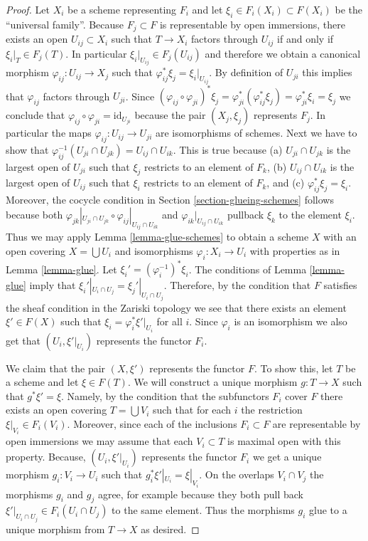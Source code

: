 \begin{proof}
Let $X_i$ be a scheme representing $F_i$ and let
$\xi_i \in F_i(X_i) \subset F(X_i)$ be the ``universal family''.
Because $F_j \subset F$ is representable by open immersions,
there exists an open $U_{ij} \subset X_i$ such that
$T \to X_i$ factors through $U_{ij}$ if and only if
$\xi_i|_T \in F_j(T)$. In particular
$\xi_i|_{U_{ij}} \in F_j(U_{ij})$ and therefore we obtain a
canonical morphism $\varphi_{ij} : U_{ij} \to X_j$ such that
$\varphi_{ij}^*\xi_j = \xi_i|_{U_{ij}}$. By definition of $U_{ji}$
this implies that $\varphi_{ij}$ factors through $U_{ji}$.
Since $(\varphi_{ij} \circ \varphi_{ji})^*\xi_j
=\varphi_{ji}^*(\varphi_{ij}^*\xi_j) =
\varphi_{ji}^*\xi_i = \xi_j$ we conclude that
$\varphi_{ij} \circ \varphi_{ji} = \text{id}_{U_{ji}}$
because the pair $(X_j, \xi_j)$ represents $F_j$.
In particular the maps $\varphi_{ij} : U_{ij} \to U_{ji}$
are isomorphisms of schemes.
Next we have to show that
$\varphi_{ij}^{-1}(U_{ji} \cap U_{jk}) = U_{ij} \cap U_{ik}$.
This is true because (a) $U_{ji} \cap U_{jk}$ is the largest
open of $U_{ji}$ such that $\xi_j$ restricts to an element
of $F_k$, (b) $U_{ij} \cap U_{ik}$ is the largest
open of $U_{ij}$ such that $\xi_i$ restricts to an element
of $F_k$, and (c) $\varphi_{ij}^*\xi_j = \xi_i$. Moreover,
the cocycle condition in Section \ref{section-glueing-schemes}
follows because both
$\varphi_{jk}|_{U_{ji} \cap U_{jk}} \circ
\varphi_{ij}|_{U_{ij} \cap U_{ik}}$ and
$\varphi_{ik}|_{U_{ij} \cap U_{ik}}$ pullback $\xi_k$
to the element $\xi_i$.
Thus we may apply Lemma \ref{lemma-glue-schemes}
to obtain a scheme $X$ with an open
covering $X = \bigcup U_i$ and isomorphisms $\varphi_i : X_i \to U_i$
with properties as in Lemma \ref{lemma-glue}.
Let $\xi_i' = (\varphi_i^{-1})^* \xi_i$.
The conditions of Lemma \ref{lemma-glue} imply that
$\xi_i'|_{U_i \cap U_j} = \xi_j'|_{U_i \cap U_j}$.
Therefore, by the condition that $F$ satisfies the sheaf
condition in the Zariski topology we see that
there exists an element $\xi' \in F(X)$ such that
$\xi_i = \varphi_i^*\xi'|_{U_i}$ for all $i$.
Since $\varphi_i$ is an isomorphism we also get that
$(U_i, \xi'|_{U_i})$ represents the functor $F_i$.

\medskip\noindent
We claim that the pair $(X, \xi')$ represents the functor $F$.
To show this, let $T$ be a scheme and let $\xi \in F(T)$.
We will construct a unique morphism $g : T \to X$ such that
$g^*\xi' = \xi$. Namely, by the condition that the subfunctors
$F_i$ cover $F$ there exists an open covering $T = \bigcup V_i$
such that for each $i$ the restriction $\xi|_{V_i} \in F_i(V_i)$.
Moreover, since each of the inclusions $F_i \subset F$ are representable
by open immersions we may assume that each $V_i \subset T$ is maximal
open with this property.
Because, $(U_i, \xi'|_{U_i})$ represents the functor $F_i$ we
get a unique morphism $g_i : V_i \to U_i$ such that
$g_i^*\xi'|_{U_i} = \xi|_{V_i}$. On the overlaps $V_i \cap V_j$
the morphisms $g_i$ and $g_j$ agree, for example because they both
pull back $\xi'|_{U_i \cap U_j} \in F_i(U_i \cap U_j)$
to the same element. Thus the morphisms $g_i$ glue to a unique morphism
from $T \to X$ as desired.
\end{proof}

